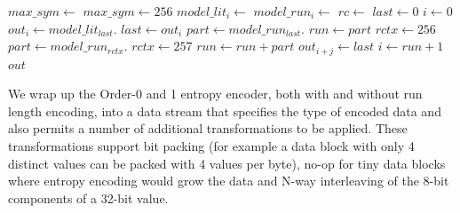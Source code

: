 \documentclass[a4paper]{article}
\begin{document}
\begin{algorithmic}[1]
  \State $max\_sym \gets $
    \State $max\_sym \gets 256$
  \EndIf
    \State $model\_lit_i \gets $
  \EndFor
    \State $model\_run_i \gets $
  \EndFor
  \Statex
  \State $rc \gets $
  \State $last \gets 0$
  \State $i \gets 0$
    \State $out_i \gets model\_lit_{last}.$
    \State $last \gets out_i$
    \State $part \gets model\_run_{last}.$
    \State $run \gets part$
    \State $rctx \gets 256$
      \State $part \gets model\_run_{rctx}.$
      \State $rctx \gets 257$
      \State $run \gets run + part$
    \EndWhile
      \State $out_{i+j} \gets last$
    \EndFor
    \State $i \gets run+1$
  \EndWhile
  \State \Return $out$
\EndFunction
\end{algorithmic}


We wrap up the Order-0 and 1 entropy encoder, both with and without run length encoding, into a data stream that specifies the type of encoded data and also permits a number of additional transformations to be applied.
These transformations support bit packing (for example a data block with only 4 distinct values can be packed with 4 values per byte), no-op for tiny data blocks where entropy encoding would grow the data and N-way interleaving of the 8-bit components of a 32-bit value.
\end{document}
